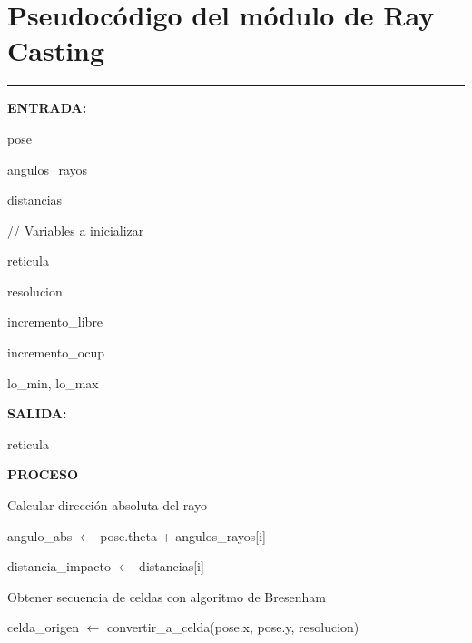 \section{Pseudocódigo del módulo de Ray Casting}
\label{apend:ray}
\begin{center}
\label{alg:raycasting}
\end{center}
\vspace{-1.6cm}
\rule{\textwidth}{0.4pt}
\vspace{-0.9cm}

\begin{algorithmic}[1]

\Statex \textbf{ENTRADA:}

\Statex pose

\Statex angulos\_rayos

\Statex distancias

\Statex \hspace{0.5cm}
// Variables a inicializar

\Statex reticula

\Statex resolucion

\Statex incremento\_libre

\Statex incremento\_ocup

\Statex lo\_min, lo\_max

\Statex
\Statex \textbf{SALIDA:}

\State reticula

\Statex
\Statex \textbf{PROCESO}

    \State Calcular dirección absoluta del rayo

    \State angulo\_abs $\gets$
    pose.theta + angulos\_rayos[i]

    \State distancia\_impacto $\gets$
    distancias[i]

    \Statex

    \State Obtener secuencia de celdas con algoritmo de Bresenham

    \State celda\_origen $\gets$
    convertir\_a\_celda(pose.x, pose.y, resolucion)


\end{algorithmic}
